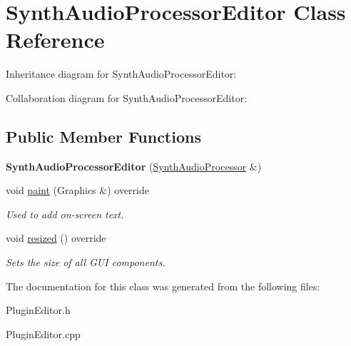 \hypertarget{class_synth_audio_processor_editor}{}\section{Synth\+Audio\+Processor\+Editor Class Reference}
\label{class_synth_audio_processor_editor}


Inheritance diagram for Synth\+Audio\+Processor\+Editor\+:


Collaboration diagram for Synth\+Audio\+Processor\+Editor\+:
\subsection*{Public Member Functions}
\begin{DoxyCompactItemize}
\item 
{\bfseries Synth\+Audio\+Processor\+Editor} (\hyperlink{class_synth_audio_processor}{Synth\+Audio\+Processor} \&)\hypertarget{class_synth_audio_processor_editor_a17979a32bca3b46522b9735e05d01019}{}\label{class_synth_audio_processor_editor_a17979a32bca3b46522b9735e05d01019}

\item 
void \hyperlink{class_synth_audio_processor_editor_a3394a233c65b7c742ab3cf727719cae9}{paint} (Graphics \&) override\hypertarget{class_synth_audio_processor_editor_a3394a233c65b7c742ab3cf727719cae9}{}\label{class_synth_audio_processor_editor_a3394a233c65b7c742ab3cf727719cae9}

\begin{DoxyCompactList}\small\item\em Used to add on-\/screen text. \end{DoxyCompactList}\item 
void \hyperlink{class_synth_audio_processor_editor_acbe9f4e05ddd3cc7b240a018e731b3f4}{resized} () override\hypertarget{class_synth_audio_processor_editor_acbe9f4e05ddd3cc7b240a018e731b3f4}{}\label{class_synth_audio_processor_editor_acbe9f4e05ddd3cc7b240a018e731b3f4}

\begin{DoxyCompactList}\small\item\em Sets the size of all G\+UI components. \end{DoxyCompactList}\end{DoxyCompactItemize}


The documentation for this class was generated from the following files\+:\begin{DoxyCompactItemize}
\item 
Plugin\+Editor.\+h\item 
Plugin\+Editor.\+cpp\end{DoxyCompactItemize}
